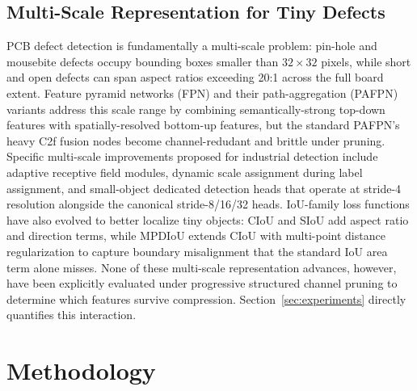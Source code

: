 ﻿\documentclass[conference]{IEEEtran}
\begin{document}
\subsection{Multi-Scale Representation for Tiny Defects}
PCB defect detection is fundamentally a multi-scale problem: pin-hole and mousebite defects occupy bounding boxes smaller than $32\times32$ pixels, while short and open defects can span aspect ratios exceeding 20:1 across the full board extent. Feature pyramid networks (FPN) and their path-aggregation (PAFPN) variants address this scale range by combining semantically-strong top-down features with spatially-resolved bottom-up features, but the standard PAFPN's heavy C2f fusion nodes become channel-redudant and brittle under pruning. Specific multi-scale improvements proposed for industrial detection include adaptive receptive field modules, dynamic scale assignment during label assignment, and small-object dedicated detection heads that operate at stride-4 resolution alongside the canonical stride-8/16/32 heads. IoU-family loss functions have also evolved to better localize tiny objects: CIoU and SIoU add aspect ratio and direction terms, while MPDIoU extends CIoU with multi-point distance regularization to capture boundary misalignment that the standard IoU area term alone misses. None of these multi-scale representation advances, however, have been explicitly evaluated under progressive structured channel pruning to determine which features survive compression. Section~\ref{sec:experiments} directly quantifies this interaction.

\section{Methodology}
\label{sec:methodology}
\end{document}
